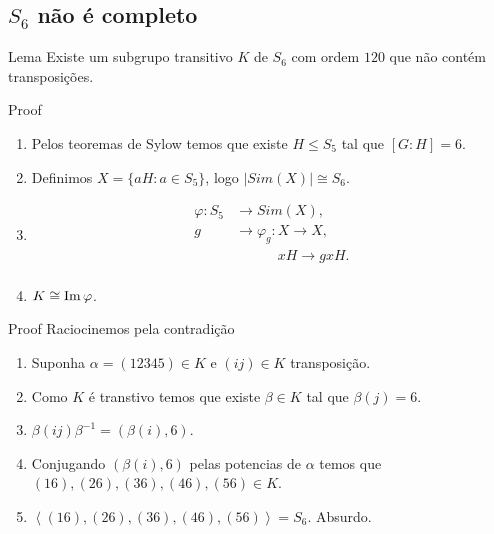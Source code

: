 \subsection{$S_6$ não é completo}
\begin{frame}{}
  \begin{block}{Lema}
    Existe um subgrupo transitivo $K$ de $S_6$ com ordem $120$ que não contém transposições. 
  \end{block}
  \begin{block}{Proof}
    \begin{enumerate}
      \item Pelos teoremas de Sylow temos que existe $H\leq S_5$ tal que $[G:H]=6$.\\
      \item Definimos $X=\{aH:a\in S_5\}$, logo $|Sim(X)|\cong S_6$.
      \item 
        \begin{align*}
          \varphi:S_5&\to Sim(X),\\
                  g&\to \varphi_g:X\to X,\\
        \phantom{g}&\phantom{\to \varphi_g:}xH\to gxH.
        \end{align*}
      \item $K\cong \operatorname{Im}\varphi$.
    \end{enumerate}
  \end{block}
\end{frame}
\begin{frame}{}
  \begin{block}{Proof}
    Raciocinemos pela contradição
    \begin{enumerate}
      \item Suponha $\alpha=(12345)\in K$ e $(ij)\in K$ transposição.
      \item Como $K$ é transtivo temos que existe $\beta\in K$ tal que $\beta(j)=6$.
      \item $\beta(ij)\beta^{-1}=(\beta(i),6)$.
      \item Conjugando $(\beta(i),6)$ pelas potencias de $\alpha$ temos que $(16),(26),(36),(46),(56)\in K$.
      \item $\left\langle (16),(26),(36),(46),(56) \right\rangle=S_6$. Absurdo.
    \end{enumerate}        
  \end{block}
\end{frame}
